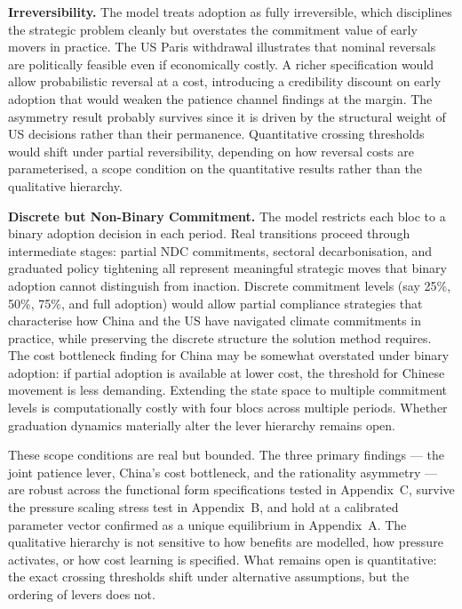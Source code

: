 \documentclass[10pt,a4paper]{article}
\begin{document}
\textbf{Irreversibility.} The model treats adoption as fully irreversible, which disciplines the strategic
problem cleanly but overstates the commitment value of early movers in practice. The US Paris withdrawal
illustrates that nominal reversals are politically feasible even if economically costly. A richer specification
would allow probabilistic reversal at a cost, introducing a credibility discount on early adoption that
would weaken the patience channel findings at the margin. The asymmetry result probably survives since it is driven by the structural weight of US decisions rather than their permanence. Quantitative crossing thresholds would shift under partial reversibility, depending on how reversal costs are parameterised, a scope condition on the quantitative results rather than the qualitative hierarchy.

\textbf{Discrete but Non-Binary Commitment.} The model restricts each bloc to a binary adoption decision in
each period. Real transitions proceed through intermediate stages: partial NDC commitments, sectoral
decarbonisation, and graduated policy tightening all represent meaningful strategic moves that binary
adoption cannot distinguish from inaction. Discrete commitment levels (say 25\%, 50\%, 75\%, and full adoption) would allow partial compliance strategies that characterise how China and the US have navigated climate commitments in practice, while preserving the discrete structure the solution method requires. The cost bottleneck finding for China may be somewhat overstated under binary adoption: if partial adoption is available at lower cost, the threshold for Chinese movement is less demanding. Extending the state space to multiple commitment levels is computationally costly with four blocs across multiple periods. Whether graduation dynamics materially alter the lever hierarchy remains open.

\needspace{5em}
These scope conditions are real but bounded. The three primary findings --- the joint patience lever,
China's cost bottleneck, and the rationality asymmetry --- are robust across the functional form
specifications tested in Appendix~C, survive the pressure scaling stress test in Appendix~B, and hold
at a calibrated parameter vector confirmed as a unique equilibrium in Appendix~A. The qualitative
hierarchy is not sensitive to how benefits are modelled, how pressure activates, or how cost learning
is specified. What remains open is quantitative: the exact crossing thresholds shift under alternative
assumptions, but the ordering of levers does not.
\end{document}
